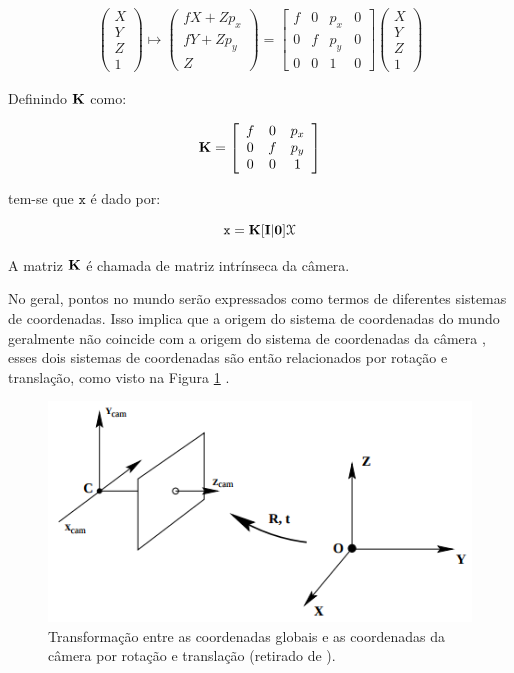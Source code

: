{\begin{align}
\left(\begin{array}{c}
X\\
Y\\
Z\\
1
\end{array}\right) \mapsto
\left(\begin{array}{c}
fX + Zp_x\\
fY + Zp_y\\
Z
\end{array}\right) =
\left[\begin{array}{cccc}
f & 0 & p_x & 0\\
0 & f & p_y & 0\\
0 & 0 & 1 & 0
\end{array}\right]
\left(\begin{array}{c}
X\\
Y\\
Z\\
1
\end{array}\right)
\label{eq:3d_vetHomogeneo2}
\end{align}

Definindo $\bf{K}$ como:

\begin{align}
\bf{K} =
\left[\begin{array}{ccc}
f & 0 & p_x\\
0 & f & p_y\\
0 & 0 & 1
\end{array}\right]
\label{eq:3d_matIntrinseca}
\end{align}

tem-se que $\mathtt{x}$ é dado por:

\begin{equation}
\mathtt{x} = \bf{K}[\bf{I}|0]\mathcal{X}
\label{3d_camModel1}
\end{equation}

A matriz $\bf{K}$ é chamada de matriz intrínseca da câmera.

No geral, pontos no mundo serão expressados como termos de diferentes sistemas
de coordenadas. Isso implica que a origem do sistema de coordenadas do mundo
geralmente não coincide com a origem do sistema de coordenadas da câmera
\cite{hartley2003multiple}, esses dois sistemas de coordenadas são então
relacionados por rotação e translação, como visto na Figura \ref{fig:trans_rot}
.

\begin{figure}[h!]
\centering
\includegraphics[width=.5\linewidth]{figs/TG_rot_tr.png}
\caption{Transformação entre as coordenadas globais e as coordenadas da câmera por rotação e translação (retirado de \cite{hartley2003multiple}).}
\label{fig:trans_rot}
\end{figure}

}
